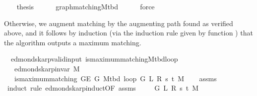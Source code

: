 \begin{isabellebody}
\ \ \isamarkupfalse%
\ {\isacharquery}{\kern0pt}thesis\isanewline
\ \ \ \ \isamarkupfalse%
\ graph{\isacharunderscore}{\kern0pt}matching{\isacharunderscore}{\kern0pt}M{\isacharunderscore}{\kern0pt}tbd\isanewline
\ \ \ \ \isamarkupfalse%
\ force\isanewline
{}\isamarkupfalse%
%
\endisatagproof
{\isafoldproof}%
%
\isadelimproof
%
\endisadelimproof
%
\begin{isamarkuptext}%
Otherwise, we augment matching  by the augmenting path found as verified above, and it
follows by induction (via the induction rule given by function ) that the
algorithm outputs a maximum matching.%
\end{isamarkuptext}\isamarkuptrue%
\isamarkupfalse%
\ {\isacharparenleft}{\kern0pt}\ edmonds{\isacharunderscore}{\kern0pt}karp{\isacharunderscore}{\kern0pt}valid{\isacharunderscore}{\kern0pt}input{\isacharparenright}{\kern0pt}\ is{\isacharunderscore}{\kern0pt}maximum{\isacharunderscore}{\kern0pt}matching{\isacharunderscore}{\kern0pt}M{\isacharunderscore}{\kern0pt}tbd{\isacharunderscore}{\kern0pt}loop{\isacharprime}{\kern0pt}{\isacharcolon}{\kern0pt}\isanewline
\ \ \ {\isachardoublequoteopen}edmonds{\isacharunderscore}{\kern0pt}karp{\isacharunderscore}{\kern0pt}invar{\isacharprime}{\kern0pt}{\isacharprime}{\kern0pt}\ M{\isachardoublequoteclose}\isanewline
\ \ \ {\isachardoublequoteopen}is{\isacharunderscore}{\kern0pt}maximum{\isacharunderscore}{\kern0pt}matching\ {\isacharparenleft}{\kern0pt}G{\isachardot}{\kern0pt}E\ G{\isacharparenright}{\kern0pt}\ {\isacharparenleft}{\kern0pt}M{\isacharunderscore}{\kern0pt}tbd\ {\isacharparenleft}{\kern0pt}loop{\isacharprime}{\kern0pt}\ G\ L\ R\ s\ t\ M{\isacharparenright}{\kern0pt}{\isacharparenright}{\kern0pt}{\isachardoublequoteclose}\isanewline
%
\isadelimproof
\ \ %
\endisadelimproof
%
\isatagproof
{}\isamarkupfalse%
\ assms%
\endisatagproof
{\isafoldproof}%
%
\isadelimproof
\isanewline
%
\endisadelimproof
%
\isadelimvisible
%
\endisadelimvisible
%
\isatagvisible
{}\isamarkupfalse%
\ {\isacharparenleft}{\kern0pt}induct\ rule{\isacharcolon}{\kern0pt}\ edmonds{\isacharunderscore}{\kern0pt}karp{\isacharunderscore}{\kern0pt}induct{\isacharbrackleft}{\kern0pt}OF\ assms{\isacharbrackright}{\kern0pt}{\isacharparenright}{\kern0pt}\isanewline
\ \ \isamarkupfalse%
\ {\isacharparenleft}{\kern0pt}{}\ G\ L\ R\ s\ t\ M{\isacharparenright}{\kern0pt}\isanewline

\end{isabellebody}
